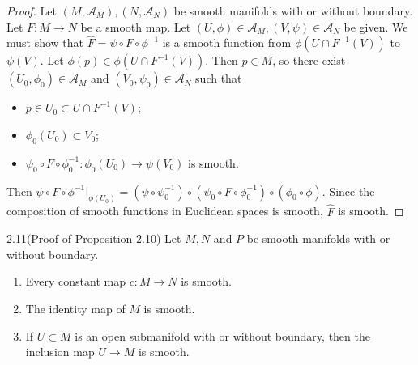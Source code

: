 \begin{proof}
  Let $(M, \mathcal{A}_M), (N, \mathcal{A}_N)$ be smooth manifolds with or without boundary.
  Let $F: M \rightarrow N$ be a smooth map.
  Let $(U, \phi) \in \mathcal{A}_M, (V, \psi) \in \mathcal{A}_N$ be given.
  We must show that $\hat{F} = \psi \circ F \circ \phi^{-1}$ is a smooth function from $\phi(U \cap F^{-1}(V))$ to $\psi(V)$.
  Let $\phi(p) \in \phi(U \cap F^{-1}(V))$.
  Then $p \in M$, so there exist $(U_0, \phi_0) \in \mathcal{A}_M$ and $(V_0, \psi_0) \in \mathcal{A}_N$ such that
  \begin{itemize}
    \item
      $p \in U_0 \subset U \cap F^{-1}(V)$;
    \item
      $\phi_0(U_0) \subset V_0$;
    \item
      $\psi_0 \circ F \circ \phi_0^{-1}:\phi_0(U_0) \rightarrow \psi(V_0)$ is smooth.
  \end{itemize}
  Then $\psi \circ F \circ \phi^{-1} \vert_{\phi(U_0)} = (\psi \circ \psi_0^{-1}) \circ (\psi_0 \circ F \circ \phi_0^{-1}) \circ (\phi_0 \circ \phi)$.
  Since the composition of smooth functions in Euclidean spaces is smooth, $\hat{F}$ is smooth.
\end{proof}

\begin{customexer}{2.11(Proof of Proposition 2.10)}
  Let $M, N$ and $P$ be smooth manifolds with or without boundary.
  \begin{enumerate}[label=(\alph*)]
    \item 
      Every constant map $c: M \rightarrow N$ is smooth.
    \item
      The identity map of $M$ is smooth.
    \item
      If $U \subset M$ is an open submanifold with or without boundary, then the inclusion map $U \rightarrow M$ is smooth.
  \end{enumerate}
\end{customexer}

